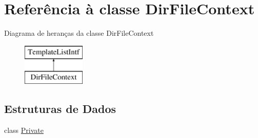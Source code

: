 \hypertarget{class_dir_file_context}{\section{Referência à classe Dir\-File\-Context}
\label{class_dir_file_context}
}
Diagrama de heranças da classe Dir\-File\-Context\begin{figure}[H]
\begin{center}
\leavevmode
\includegraphics[height=2.000000cm]{class_dir_file_context}
\end{center}
\end{figure}
\subsection*{Estruturas de Dados}
\begin{DoxyCompactItemize}
\item 
class \hyperlink{class_dir_file_context_1_1_private}{Private}
\end{DoxyCompactItemize}
